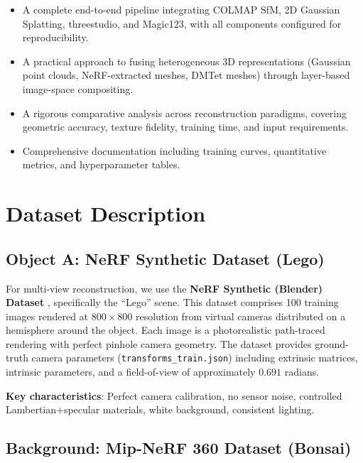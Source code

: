 \documentclass{article}
\begin{document}
\begin{itemize}[leftmargin=*]
    \item A complete end-to-end pipeline integrating COLMAP SfM, 2D Gaussian
    Splatting, threestudio, and Magic123, with all components configured for
    reproducibility.
    \item A practical approach to fusing heterogeneous 3D representations
    (Gaussian point clouds, NeRF-extracted meshes, DMTet meshes) through
    layer-based image-space compositing.
    \item A rigorous comparative analysis across reconstruction paradigms,
    covering geometric accuracy, texture fidelity, training time, and input
    requirements.
    \item Comprehensive documentation including training curves, quantitative
    metrics, and hyperparameter tables.
\end{itemize}

\section{Dataset Description}

\subsection{Object A: NeRF Synthetic Dataset (Lego)}

For multi-view reconstruction, we use the \textbf{NeRF Synthetic (Blender) Dataset}
\cite{mildenhall2020nerf}, specifically the ``Lego'' scene. This dataset comprises
100 training images rendered at $800\times800$ resolution from virtual cameras
distributed on a hemisphere around the object. Each image is a photorealistic
path-traced rendering with perfect pinhole camera geometry. The dataset provides
ground-truth camera parameters (\texttt{transforms\_train.json}) including
extrinsic matrices, intrinsic parameters, and a field-of-view of approximately
$0.691$ radians.

\textbf{Key characteristics}: Perfect camera calibration, no sensor noise,
controlled Lambertian+specular materials, white background, consistent lighting.

\subsection{Background: Mip-NeRF 360 Dataset (Bonsai)}
\end{document}
